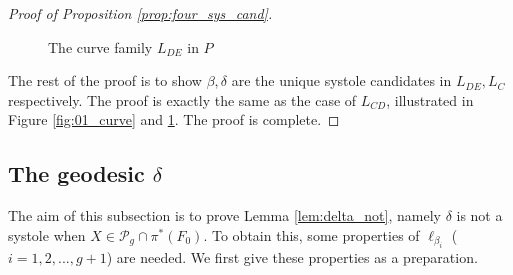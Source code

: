 \documentclass[UTF8]{amsart}
\numberwithin{equation}{section}
\theoremstyle{definition}
\theoremstyle{example}
\theoremstyle{remark}
\begin{document}
\begin{proof}[Proof of Proposition \ref{prop:four_sys_cand}]
\begin{figure}[htbp]
 \caption{The curve family $L_{DE}$ in $P$}
 \label{fig:11_curve}
\end{figure}

The rest of the proof is to show $\beta, \delta$ are the unique systole candidates in $L_{DE}, L_C$ respectively. The proof is exactly the same as the case of $L_{CD}$, illustrated in Figure \ref{fig:01_curve} and \ref{fig:11_curve}. The proof is complete. 

\end{proof}

\subsection{The geodesic $\delta$}
The aim of this subsection is to prove Lemma \ref{lem:delta_not}, namely $\delta$ is not a systole when $X\in \mathcal{P}_g \cap \pi^{*}(F_0)$. To obtain this, some properties of $\ell_{\beta_i}$ ($i=1,2,..., g+1$) are needed. We first give these properties as a preparation. 
\end{document}
